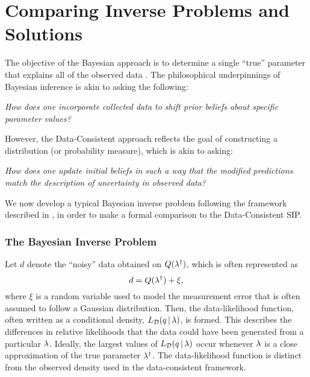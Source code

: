 \section{Comparing Inverse Problems and Solutions}\label{sec:compare}

The objective of the Bayesian approach is to determine a single ``true'' parameter that explains all of the observed data \citep{Smith, Concrete, Complete, Stuart10, Tarantola_book}.
The philosophical underpinnings of Bayesian inference is akin to asking the following:

\begin{center}
  \emph{How does one incorporate collected data to shift prior beliefs about specific parameter values?}
\end{center}

However, the Data-Consistent approach reflects the goal of constructing a distribution (or probability measure), which is akin to asking:

\begin{center}
  \emph{How does one update initial beliefs in such a way that the modified predictions match the description of uncertainty in observed data?}
\end{center}

We now develop a typical Bayesian inverse problem following the framework described in \cite{Stuart10, Smith}, in order to make a formal comparison to the Data-Consistent SIP.

\subsubsection{The Bayesian Inverse Problem}
Let $d$ denote the ``noisy'' data obtained on $Q(\lambda^\dagger)$, which is often represented as
\begin{equation*}
	d = Q(\lambda^\dagger) + \xi,
\end{equation*}
where $\xi$ is a random variable used to model the measurement error that is often assumed to follow a Gaussian distribution.
Then, the data-likelihood function, often written as a conditional density, $L_{\mathcal{D}}(q \, |\, \lambda)$, is formed.
This describes the differences in relative likelihoods that the data could have been generated from a particular $\lambda$.
Ideally, the largest values of $L_{\mathcal{D}}(q \, | \, \lambda)$ occur whenever $\lambda$ is a close approximation of the true parameter $\lambda^\dagger$.
The data-likelihood function is distinct from the observed density used in the data-consistent framework.

